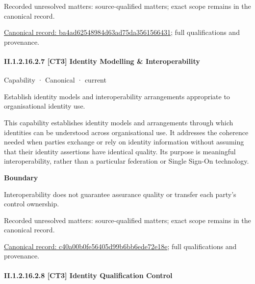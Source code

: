 {\small Recorded unresolved matters: source-qualified matters; exact scope remains in the canonical record.}\par
{\footnotesize \href{../../../../../../../continuum/strategy/capability/ba4ad62548984d63ad75da3561566431.md}{Canonical record: ba4ad62548984d63ad75da3561566431}; full qualifications and provenance.}\par
\paragraph*{II.1.2.16.2.7 [CT3] Identity Modelling \& Interoperability}
\label{navigation:II.1.2.16.2.7}

\label{element:c40a00b0fe56405d99b6bb6ede72e18e}
{\small Capability · Canonical · current}\par

Establish identity models and interoperability arrangements appropriate to organisational identity use.



This capability establishes identity models and arrangements through which identities can be understood across organisational use. It addresses the coherence needed when parties exchange or rely on identity information without assuming that their identity assertions have identical quality. Its purpose is meaningful interoperability, rather than a particular federation or Single Sign-On technology.



\textbf{Boundary}



Interoperability does not guarantee assurance quality or transfer each party's control ownership.


{\small Recorded unresolved matters: source-qualified matters; exact scope remains in the canonical record.}\par
{\footnotesize \href{../../../../../../../continuum/strategy/capability/c40a00b0fe56405d99b6bb6ede72e18e.md}{Canonical record: c40a00b0fe56405d99b6bb6ede72e18e}; full qualifications and provenance.}\par
\paragraph*{II.1.2.16.2.8 [CT3] Identity Qualification Control}
\label{navigation:II.1.2.16.2.8}

